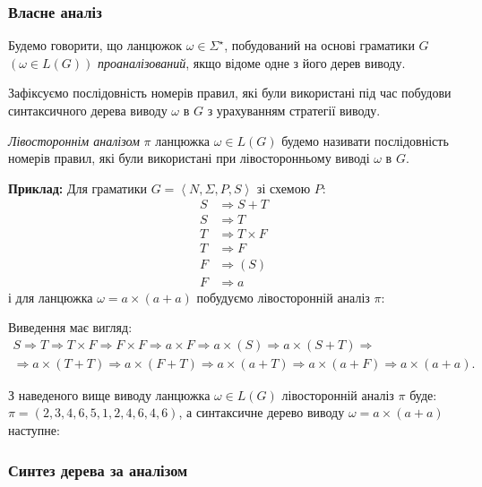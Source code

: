 \subsubsection{Власне аналіз}

Будемо говорити, що ланцюжок $\omega \in \Sigma^\star$, побудований на основі граматики $G$ $\left(\omega \in L(G)\right)$ \textit{проаналізований}, якщо відоме одне з його дерев виводу. \medskip

Зафіксуємо послідовність номерів правил, які були використані під час побудови синтаксичного дерева виводу $\omega$ в $G$ з урахуванням стратегії виводу. \medskip

\textit{Лівостороннім аналізом} $\pi$ ланцюжка $\omega \in L(G)$ будемо називати послідовність номерів правил, які були використані при лівосторонньому виводі $\omega$ в $G$. \medskip

\textbf{Приклад:} Для граматики $G = \left\langle N, \Sigma, P, S\right\rangle$ зі схемою $P$:
\begin{align}
S &\Rightarrow S + T \\
S &\Rightarrow T \\
T &\Rightarrow T \times F \\
T &\Rightarrow F \\
F &\Rightarrow (S) \\
F &\Rightarrow a
\end{align}
і для ланцюжка $\omega = a \times (a + a)$ побудуємо лівосторонній аналіз $\pi$: \medskip

Виведення має вигляд:
\begin{multline*}
S \Rightarrow T \Rightarrow T \times F \Rightarrow F \times F \Rightarrow a \times F \Rightarrow a \times (S) \Rightarrow a \times (S + T) \Rightarrow \\
\Rightarrow a \times (T + T) \Rightarrow a \times (F + T) \Rightarrow a \times (a + T) \Rightarrow a \times (a + F) \Rightarrow a \times (a + a).
\end{multline*}

З наведеного вище виводу ланцюжка $\omega \in L(G)$ лівосторонній аналіз $\pi$ буде: $\pi = (2, 3, 4, 6, 5, 1, 2, 4, 6, 4, 6)$, а синтаксичне дерево виводу $\omega = a \times (a + a)$ наступне:
\begin{figure}[H]
	\centering
	
\end{figure}

\subsubsection{Синтез дерева за аналізом}

